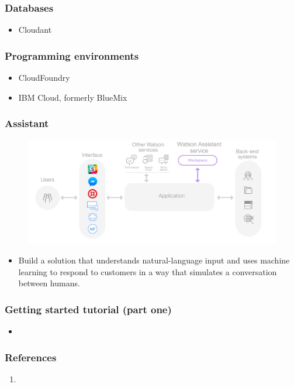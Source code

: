 \documentclass[11pt]{beamer}
\begin{document}
\begin{frame}
\frametitle{Databases}
\begin{itemize}
	\item Cloudant
\end{itemize}
\end{frame}

\begin{frame}
\frametitle{Programming environments}
\begin{itemize}
	\item CloudFoundry
	\item IBM Cloud, formerly BlueMix
\end{itemize}
\end{frame}

\begin{frame}
\frametitle{Assistant}
\begin{figure}[h]
	\centering
	\includegraphics[scale=.2]{images/conversation_arch_overview}
	\label{conversation_arch_overview}
\end{figure}
\begin{itemize}
	\item Build a solution that understands natural-language input and uses machine learning to respond to customers in a way that simulates a conversation between humans.
\end{itemize}
\end{frame}

\begin{frame}
\frametitle{Getting started tutorial (part one)}
\begin{itemize}
	\item 
\end{itemize}
\end{frame}

\begin{frame}
\frametitle{References}
\begin{enumerate}
	\item 
\end{enumerate}
\end{frame}
\end{document}
